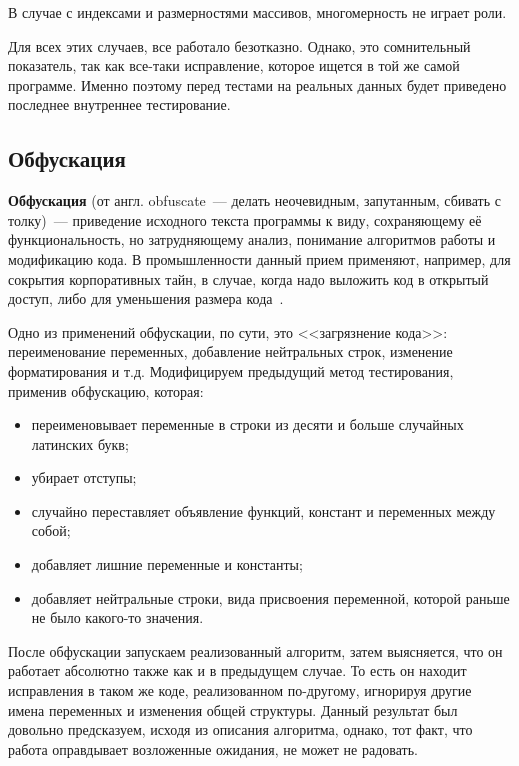 В случае с индексами и размерностями массивов, многомерность не играет роли.

Для всех этих случаев, все работало безотказно. Однако, это сомнительный показатель, так как все-таки исправление, которое ищется
в той же самой программе. Именно поэтому перед тестами на реальных данных будет приведено последнее внутреннее тестирование. 
\subsection{Обфускация}
\textbf{Обфускация} (от англ. obfuscate~--- делать неочевидным, запутанным, сбивать с толку)~--- приведение исходного текста 
программы к виду, сохраняющему её функциональность, но затрудняющему анализ, понимание алгоритмов работы и модификацию кода. 
В промышленности данный прием применяют, например, для сокрытия корпоративных тайн, в случае, когда надо выложить код в открытый
доступ, либо для уменьшения размера кода~\cite{obfuscation}.

Одно из применений обфускации, по сути, это <<загрязнение кода>>: переименование переменных, добавление нейтральных строк, изменение форматирования
и т.д. Модифицируем предыдущий метод тестирования, применив обфускацию, которая:
\begin{itemize}
    \item переименовывает переменные в строки из десяти и больше случайных латинских букв;
    \item убирает отступы;
    \item случайно переставляет объявление функций, констант и переменных между собой;
    \item добавляет лишние переменные и константы;
    \item добавляет нейтральные строки, вида присвоения переменной, которой раньше не было какого-то значения.
\end{itemize} 

После обфускации запускаем реализованный алгоритм, затем выясняется, что он работает абсолютно также как и  в предыдущем случае.
То есть он находит исправления в таком же коде, реализованном по-другому, игнорируя другие имена переменных и изменения общей структуры.
Данный результат был довольно предсказуем, исходя из описания алгоритма, однако, тот факт, что работа оправдывает 
возложенные ожидания, не может не радовать.

